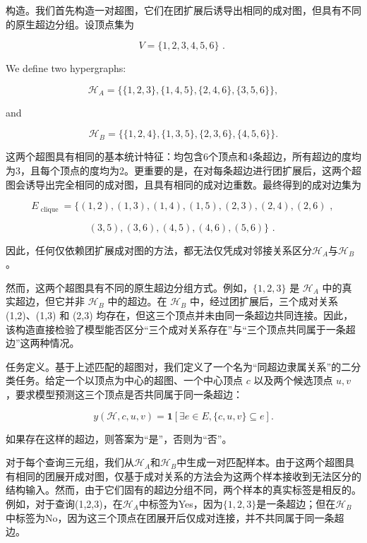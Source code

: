 \documentclass[10pt]{article}
\begin{document}
构造。我们首先构造一对超图，它们在团扩展后诱导出相同的成对图，但具有不同的原生超边分组。设顶点集为

\[
V = \{ 1,2,3,4,5,6\} \text{ . } \tag{15}
\]

We define two hypergraphs:

\[
{\mathcal{H}}_{A} = \{ \{ 1,2,3\} ,\{ 1,4,5\} ,\{ 2,4,6\} ,\{ 3,5,6\} \} , \tag{16}
\]

and

\[
{\mathcal{H}}_{B} = \{ \{ 1,2,4\} ,\{ 1,3,5\} ,\{ 2,3,6\} ,\{ 4,5,6\} \} . \tag{17}
\]

这两个超图具有相同的基本统计特征：均包含6个顶点和4条超边，所有超边的度均为3，且每个顶点的度均为2。更重要的是，在对每条超边进行团扩展后，这两个超图会诱导出完全相同的成对图，且具有相同的成对边重数。最终得到的成对边集为

\[
{E}_{\text{ clique }} = \{ \left( {1,2}\right) ,\left( {1,3}\right) ,\left( {1,4}\right) ,\left( {1,5}\right) ,\left( {2,3}\right) ,\left( {2,4}\right) ,\left( {2,6}\right) \text{ , } \tag{18}
\]

\[
\left( {3,5}\right) ,\left( {3,6}\right) ,\left( {4,5}\right) ,\left( {4,6}\right) ,\left( {5,6}\right) \} \text{ . }
\]

因此，任何仅依赖团扩展成对图的方法，都无法仅凭成对邻接关系区分\({\mathcal{H}}_{A}\)与\({\mathcal{H}}_{B}\)。

然而，这两个超图具有不同的原生超边分组方式。例如，\(\{ 1,2,3\}\) 是 \({\mathcal{H}}_{A}\) 中的真实超边，但它并非 \({\mathcal{H}}_{B}\) 中的超边。在 \({\mathcal{H}}_{B}\) 中，经过团扩展后，三个成对关系 (1,2)、(1,3) 和 (2,3) 均存在，但这三个顶点并未由同一条超边共同连接。因此，该构造直接检验了模型能否区分“三个成对关系存在”与“三个顶点共同属于一条超边”这两种情况。

任务定义。基于上述匹配的超图对，我们定义了一个名为“同超边隶属关系”的二分类任务。给定一个以顶点为中心的超图、一个中心顶点 \(c\) 以及两个候选顶点 \(u,v\) ，要求模型预测这三个顶点是否共同属于同一条超边：

\[
y\left( {\mathcal{H},c,u,v}\right)  = \mathbf{1}\left\lbrack  {\exists e \in  E,\{ c,u,v\}  \subseteq  e}\right\rbrack  . \tag{19}
\]

如果存在这样的超边，则答案为“是”，否则为“否”。

对于每个查询三元组，我们从\({\mathcal{H}}_{A}\)和\({\mathcal{H}}_{B}\)中生成一对匹配样本。由于这两个超图具有相同的团展开成对图，仅基于成对关系的方法会为这两个样本接收到无法区分的结构输入。然而，由于它们固有的超边分组不同，两个样本的真实标签是相反的。例如，对于查询(1,2,3)，在\({\mathcal{H}}_{A}\)中标签为Yes，因为\(\{ 1,2,3\}\)是一条超边；但在\({\mathcal{H}}_{B}\)中标签为No，因为这三个顶点在团展开后仅成对连接，并不共同属于同一条超边。
\end{document}
